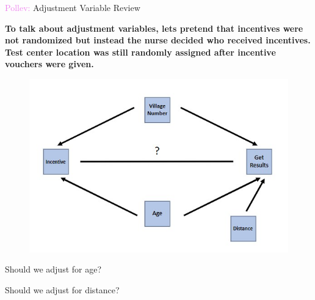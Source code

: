 \documentclass[10pt,t]{beamer}
\begin{document}
\begin{frame}{\textcolor{violet}{Pollev:} Adjustment Variable Review}
	
	\vspace{-5 mm}
	
	\textbf{To talk about adjustment variables, lets pretend that incentives were not randomized but instead the nurse decided who received incentives. Test center location was still randomly assigned after incentive vouchers were given.}
	
	
	\begin{figure}
		\centering
		\includegraphics[scale = 0.35]{./figs/HIV_dag}
	\end{figure}
	
	Should we adjust for age? %
	
	\medskip
	
	Should we adjust for distance? %
	
\end{frame}

%	
%	 
\end{document}
